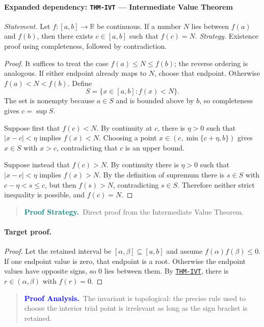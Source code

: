 \documentclass[10pt]{article}
\newcommand{\pidraw}[1]{\begingroup\urlstyle{tt}\nolinkurl{#1}\endgroup}
\newcommand{\pidref}[1]{\hyperref[prf:#1]{\pidraw{#1}}}
\newcommand{\pid}[1]{\pidref{#1}}
\theoremstyle{definition}
\theoremstyle{remark}
\newenvironment{proofstrategy}
{\begin{quote}\small\noindent\textbf{\textcolor{teal}{Proof Strategy.}}\ }
{\end{quote}}
\newenvironment{proofanalysis}
{\begin{quote}\small\noindent\textbf{\textcolor{blue}{Proof Analysis.}}\ }
{\end{quote}}
\begin{document}
\paragraph{Expanded dependency: \pidraw{THM-IVT} --- Intermediate Value Theorem}
\textit{Statement.} Let $f:[a,b]\to\mathbb{R}$ be continuous. If a number $N$ lies between
$f(a)$ and $f(b)$, then there exists $c\in[a,b]$ such that $f(c)=N$.
\textit{Strategy.} Existence proof using completeness, followed by contradiction.
\begin{proof}It suffices to treat the case $f(a)\le N\le f(b)$; the reverse ordering is analogous.
If either endpoint already maps to $N$, choose that endpoint. Otherwise
$f(a)<N<f(b)$. Define
\[
S=\{x\in[a,b]: f(x)<N\}.
\]
The set is nonempty because $a\in S$ and is bounded above by $b$, so completeness
gives $c=\sup S$.

Suppose first that $f(c)<N$. By continuity at $c$, there is $\eta>0$ such that
$|x-c|<\eta$ implies $f(x)<N$. Choosing a point
$x\in(c,\min\{c+\eta,b\})$ gives $x\in S$ with $x>c$, contradicting that $c$
is an upper bound.

Suppose instead that $f(c)>N$. By continuity there is $\eta>0$ such that
$|x-c|<\eta$ implies $f(x)>N$. By the definition of supremum there is
$s\in S$ with $c-\eta<s\le c$, but then $f(s)>N$, contradicting $s\in S$.
Therefore neither strict inequality is possible, and $f(c)=N$.\end{proof}

\begin{proofstrategy}Direct proof from the Intermediate Value Theorem.\end{proofstrategy}

\paragraph{Target proof.}

\begin{proof}

Let the retained interval be $[\alpha,\beta]\subseteq[a,b]$ and assume
$f(\alpha)f(\beta)\le0$. If one endpoint value is zero, that endpoint is a root.
Otherwise the endpoint values have opposite signs, so $0$ lies between them.
By \pid{THM-IVT}, there is $r\in(\alpha,\beta)$ with $f(r)=0$.

\end{proof}

\begin{proofanalysis}The invariant is topological: the precise rule used to choose the interior trial point is irrelevant as long as the sign bracket is retained.\end{proofanalysis}
\end{document}
